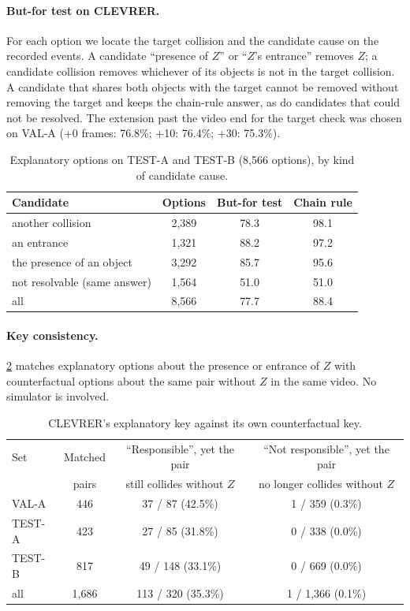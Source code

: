 \paragraph{But-for test on CLEVRER.}
For each option we locate the target collision and the candidate cause on the recorded events.
A candidate ``presence of $Z$'' or ``$Z$'s entrance'' removes $Z$; a candidate collision removes whichever of its objects is not in the target collision.
A candidate that shares both objects with the target cannot be removed without removing the target and keeps the chain-rule answer, as do candidates that could not be resolved.
The extension past the video end for the target check was chosen on VAL-A (+0 frames: 76.8\%; +10: 76.4\%; +30: 75.3\%).

\begin{table}[h]
\caption{Explanatory options on TEST-A and TEST-B (8,566 options), by kind of candidate cause.}
\label{tab:butfor}
\centering
\small
\begin{tabular}{@{}lccc@{}}
\toprule
Candidate & Options & But-for test & Chain rule \\
\midrule
another collision & 2,389 & 78.3 & 98.1 \\
an entrance & 1,321 & 88.2 & 97.2 \\
the presence of an object & 3,292 & 85.7 & 95.6 \\
not resolvable (same answer) & 1,564 & 51.0 & 51.0 \\
\midrule
all & 8,566 & 77.7 & 88.4 \\
\bottomrule
\end{tabular}
\end{table}

\paragraph{Key consistency.}
\cref{tab:consistency} matches explanatory options about the presence or entrance of $Z$ with counterfactual options about the same pair without $Z$ in the same video. No simulator is involved.

\begin{table}[h]
\caption{CLEVRER's explanatory key against its own counterfactual key.}
\label{tab:consistency}
\centering
\small
\begin{tabular}{@{}lccc@{}}
\toprule
Set & Matched & ``Responsible'', yet the pair & ``Not responsible'', yet the pair \\
 & pairs & still collides without $Z$ & no longer collides without $Z$ \\
\midrule
VAL-A & 446 & 37 / 87 (42.5\%) & 1 / 359 (0.3\%) \\
TEST-A & 423 & 27 / 85 (31.8\%) & 0 / 338 (0.0\%) \\
TEST-B & 817 & 49 / 148 (33.1\%) & 0 / 669 (0.0\%) \\
\midrule
all & 1,686 & 113 / 320 (35.3\%) & 1 / 1,366 (0.1\%) \\
\bottomrule
\end{tabular}
\end{table}

